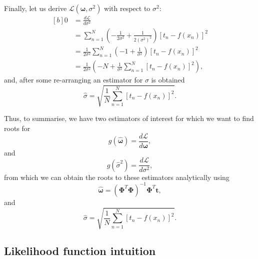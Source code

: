 \documentclass{article}
\begin{document}
Finally, let us derive $\mathcal{L}(\boldsymbol\omega, \sigma^2)$ with respect to $\sigma^2$:
\begin{equation}
\begin{aligned}[b]
0 &= \frac{d\mathcal{L}}{d\sigma^2} \\
&= \sum_{n=1}^{N} \left( -\frac{1}{2\sigma^2} + \frac{1}{2(\sigma^2)^2} \right)\left[ t_n - f(x_n)\right] ^2 \\
&= \frac{1}{2\sigma^2}\sum_{n=1}^{N} \left( -1 + \frac{1}{\sigma^2} \right)\left[ t_n - f(x_n)\right] ^2 \\
&= \frac{1}{2\sigma^2}\left(-N + \frac{1}{\sigma^2}\sum_{n=1}^{N} \left[ t_n - f(x_n)\right] ^2 \right),
\end{aligned}
\end{equation}
and, after some re-arranging an estimator for $\sigma$ is obtained
\begin{equation}
\hat{\sigma} = \sqrt{\frac{1}{N}\sum_{n=1}^{N} \left[ t_n - f(x_n)\right] ^2}.
\end{equation}

Thus, to summarise, we have two estimators of interest for which we want to find roots for 
\begin{equation}
g(\hat{\boldsymbol\omega}) = \frac{d\mathcal{L}}{d\boldsymbol\omega},
\end{equation}
and 
\begin{equation}
g(\hat{\sigma}^2) = \frac{d\mathcal{L}}{d\sigma^2},
\end{equation}
from which we can obtain the roots to these estimators analytically using
\begin{equation}
\hat{\boldsymbol\omega} = \left( \boldsymbol\Phi^T \boldsymbol\Phi \right)^{-1} \boldsymbol\Phi^T \mathbf{t},
\end{equation}
and 
\begin{equation}
\hat{\sigma} = \sqrt{\frac{1}{N}\sum_{n=1}^{N} \left[ t_n - f(x_n)\right] ^2}.
\end{equation}

\subsection{Likelihood function intuition}
\end{document}
